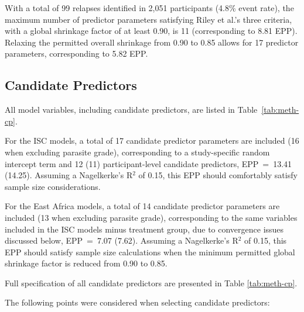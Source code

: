 With a total of 99 relapses identified in 2,051 participants (4.8\% event rate), the maximum number of predictor parameters satisfying Riley et al.'s three criteria, with a global shrinkage factor of at least 0.90, is 11 (corresponding to 8.81 EPP). Relaxing the permitted overall shrinkage from 0.90 to 0.85 allows for 17 predictor parameters, corresponding to 5.82 EPP.

\subsection{\label{sec:meth-candidate-pred}Candidate Predictors}

All model variables, including candidate predictors, are listed in Table~\ref{tab:meth-cp}.

For the ISC models, a total of 17 candidate predictor parameters are included (16 when excluding parasite grade), corresponding to a study-specific random intercept term and 12 (11) participant-level candidate predictors, EPP~=~13.41 (14.25). Assuming a Nagelkerke's R$^2$ of 0.15, this EPP should comfortably satisfy sample size considerations.

For the East Africa models, a total of 14 candidate predictor parameters are included (13 when excluding parasite grade), corresponding to the same variables included in the ISC models minus treatment group, due to convergence issues discussed below, EPP~=~7.07 (7.62). Assuming a Nagelkerke's R$^2$ of 0.15, this EPP should satisfy sample size calculations when the minimum permitted global shrinkage factor is reduced from 0.90 to 0.85.

Full specification of all candidate predictors are presented in Table \ref{tab:meth-cp}.



The following points were considered when selecting candidate predictors:

